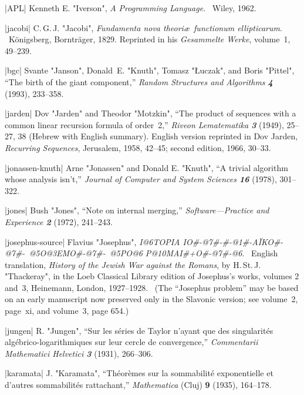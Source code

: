 
\bib|APL|%
Kenneth E. "Iverson", {\sl A Programming Language}. \
Wiley, 1962.

\bib|jacobi|%
C.\,G.\,J. "Jacobi", {\sl Fundamenta nova theori\ae\ functionum ellipticarum}. \
K\"onigsberg, Borntr\"ager, 1829. Reprinted in his {\sl Gesammelte Werke},
volume~1, 49--239.

\bib|bgc|%
Svante "Janson", Donald~E. "Knuth", Tomasz "{\L}uczak", and Boris "Pittel",
``The birth of the giant component,'' {\sl Random Structures and
Algorithms\/ \bf4} (1993), 233--358.

\bib|jarden|%
Dov "Jarden" and Theodor "Motzkin", ``The product of sequences with a common linear
recursion formula of order~2,'' {\sl Riveon Lematematika\/ \bf3} (1949),
25--27, 38 (Hebrew with English summary). English version reprinted in
Dov Jarden, {\sl Recurring Sequences}, Jerusalem, 1958, 42--45; second edition,
1966, 30--33.

\bib|jonassen-knuth|%
Arne "Jonassen" and Donald E. "Knuth", ``A trivial algorithm whose analysis
isn't,'' {\sl Journal of Computer and System Sciences\/ \bf16} (1978),
301--322.

\bib|jones|%
Bush "Jones", ``Note on internal merging,'' {\sl Software\dash---Practice
and Experience\/ \bf2} (1972), 241--243.

\bib|josephus-source|%
Flavius "Josephus", {\sl I@6TOPIA IO#-@7#-#-@1#-A\"IKO#-@7#-\ @5O@3EMO#-@7#-\
 @5PO@6 P@{10}\-MAI#+O#-@7#-@6}. \
English translation, {\sl History of the Jewish War against the Romans},
by H.\,St.\,J. "Thackeray",
 in the Loeb Classical Library edition of Josephus's
works, volumes 2 and~3,
Heinemann, London, 1927--1928. \ (The ``Josephus problem'' may be based
on an early manuscript now preserved only in the Slavonic version; see volume~2,
page~xi, and volume~3, page 654.)

\bib|jungen|%
R. "Jungen", ``Sur les s\'eries de Taylor n'ayant que des singularit\'es
alg\'ebrico-logarithmiques sur leur cercle de convergence,''
{\sl Commentarii Mathematici Helvetici\/ \bf3} (1931), 266--306.

\bib|karamata|%
J. "Karamata", ``Th\'eor\`emes sur la sommabilit\'e exponentielle et
d'autres sommabilit\'es rattachant,'' {\sl Mathematica\/} (Cluj) {\bf9}
(1935), 164--178.

